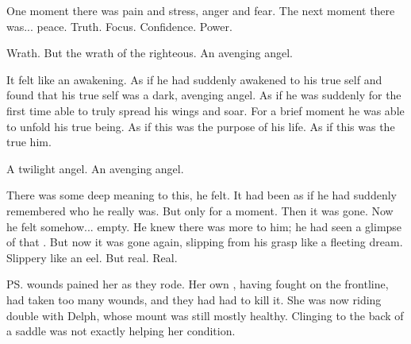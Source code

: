 One moment there was pain and stress, anger and fear. 
The next moment there was... peace. 
Truth. 
Focus. 
Confidence. 
Power. 

Wrath. 
But the wrath of the righteous. 
An avenging angel. 

It felt like an awakening. 
As if he had suddenly awakened to his true self and found that his true self was a dark, avenging angel. 
As if he was suddenly for the first time able to truly spread his wings and soar. 
For a brief moment he was able to unfold his true being. 
As if this was the purpose of his life. 
As if this was the true him. 

A twilight angel. 
An avenging angel. 


There was some deep meaning to this, he felt. 
It had been as if he had suddenly remembered who he really was. 
But only for a moment. 
Then it was gone. 
Now he felt somehow... empty. 
He knew there was more to him; he had seen a glimpse of that . 
But now it was gone again, slipping from his grasp like a fleeting dream. 
Slippery like an eel. 
But real. 
Real. 








\begin{comment}
\subsection{\Tsekkect{} contemplates}
\end{comment}
\new
\ps{\Tsekkect}{} wounds pained her as they rode. 
Her own \relc{}, having fought on the frontline, had taken too many wounds, and they had had to kill it. 
She was now riding double with Delph, whose mount was still mostly healthy. 
Clinging to the back of a saddle was not exactly helping her condition. 

